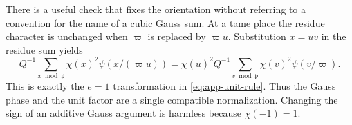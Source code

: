 There is a useful check that fixes the orientation without referring
to a convention for the name of a cubic Gauss sum.  At a tame place
the residue character is unchanged when \(\varpi\) is replaced by
\(\varpi u\).  Substitution \(x=uv\) in the residue sum yields
\[
 Q^{-1}\sum_{x\bmod\mathfrak p}\chi(x)^2\psi(x/(\varpi u))
 =\chi(u)^2 Q^{-1}\sum_{v\bmod\mathfrak p}
                         \chi(v)^2\psi(v/\varpi).
\]
This is exactly the \(e=1\) transformation in
\eqref{eq:app-unit-rule}.  Thus the Gauss phase and the unit factor
are a single compatible normalization.  Changing the sign of an
additive Gauss argument is harmless because \(\chi(-1)=1\).
